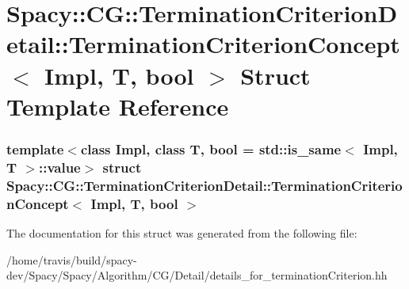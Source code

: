\hypertarget{structSpacy_1_1CG_1_1TerminationCriterionDetail_1_1TerminationCriterionConcept}{\section{\-Spacy\-:\-:\-C\-G\-:\-:\-Termination\-Criterion\-Detail\-:\-:\-Termination\-Criterion\-Concept$<$ \-Impl, \-T, bool $>$ \-Struct \-Template \-Reference}
\label{structSpacy_1_1CG_1_1TerminationCriterionDetail_1_1TerminationCriterionConcept}
}
\subsubsection*{template$<$class Impl, class T, bool = std\-::is\-\_\-same$<$ Impl, T $>$\-::value$>$ struct Spacy\-::\-C\-G\-::\-Termination\-Criterion\-Detail\-::\-Termination\-Criterion\-Concept$<$ Impl, T, bool $>$}



\-The documentation for this struct was generated from the following file\-:\begin{DoxyCompactItemize}
\item 
/home/travis/build/spacy-\/dev/\-Spacy/\-Spacy/\-Algorithm/\-C\-G/\-Detail/details\-\_\-for\-\_\-termination\-Criterion.\-hh\end{DoxyCompactItemize}
